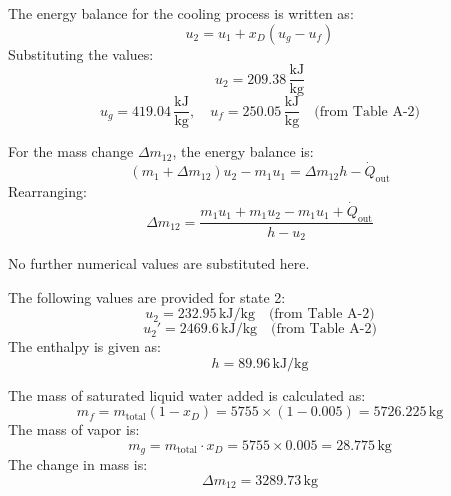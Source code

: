 The energy balance for the cooling process is written as:  
\[
u_2 = u_1 + x_D (u_g - u_f)
\]  
Substituting the values:  
\[
u_2 = 209.38 \, \frac{\text{kJ}}{\text{kg}}
\]  
\[
u_g = 419.04 \, \frac{\text{kJ}}{\text{kg}}, \quad u_f = 250.05 \, \frac{\text{kJ}}{\text{kg}} \quad \text{(from Table A-2)}
\]  

For the mass change \( \Delta m_{12} \), the energy balance is:  
\[
(m_1 + \Delta m_{12}) u_2 - m_1 u_1 = \Delta m_{12} h - \dot{Q}_{\text{out}}
\]  
Rearranging:  
\[
\Delta m_{12} = \frac{m_1 u_1 + m_1 u_2 - m_1 u_1 + \dot{Q}_{\text{out}}}{h - u_2}
\]  

No further numerical values are substituted here.

The following values are provided for state 2:  
\[
u_2 = 232.95 \, \text{kJ/kg} \quad \text{(from Table A-2)}
\]  
\[
u_2' = 2469.6 \, \text{kJ/kg} \quad \text{(from Table A-2)}
\]  
The enthalpy is given as:  
\[
h = 89.96 \, \text{kJ/kg}
\]  

The mass of saturated liquid water added is calculated as:  
\[
m_f = m_{\text{total}} (1 - x_D) = 5755 \times (1 - 0.005) = 5726.225 \, \text{kg}
\]  
The mass of vapor is:  
\[
m_g = m_{\text{total}} \cdot x_D = 5755 \times 0.005 = 28.775 \, \text{kg}
\]  
The change in mass is:  
\[
\Delta m_{12} = 3289.73 \, \text{kg}
\]